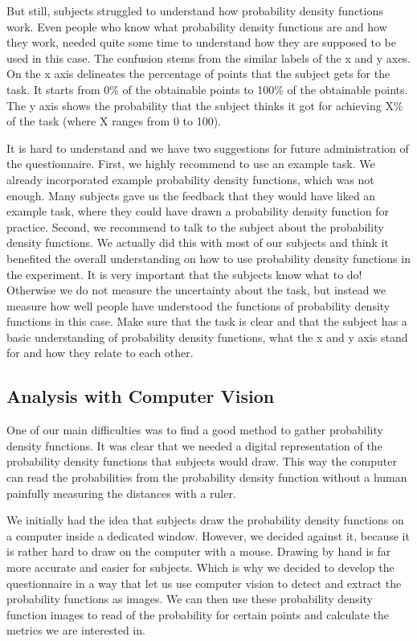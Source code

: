 \documentclass[../main/main.tex]{subfiles}
\begin{document}
	But still, subjects struggled to understand how probability density functions work. Even people who know what probability density functions are and how they work, needed quite some time to understand how they are supposed to be used in this case. The confusion stems from the similar labels of the x and y axes. On the x axis delineates the percentage of points that the subject gets for the task. It starts from 0\% of the obtainable points to 100\% of the obtainable points. The y axis shows the probability that the subject thinks it got for achieving X\% of the task (where X ranges from 0 to 100).
	
	It is hard to understand and we have two suggestions for future administration of the questionnaire. First, we highly recommend to use an example task. We already incorporated example probability density functions, which was not enough. Many subjects gave us the feedback that they would have liked an example task, where they could have drawn a probability density function for practice. Second, we recommend to talk to the subject about the probability density functions. We actually did this with most of our subjects and think it benefited the overall understanding on how to use probability density functions in the experiment. It is very important that the subjects know what to do! Otherwise we do not measure the uncertainty about the task, but instead we measure how well people have understood the functions of probability density functions in this case. Make sure that the task is clear and that the subject has a basic understanding of probability density functions, what the x and y axis stand for and how they relate to each other.
	
	\subsection{Analysis with Computer Vision}
	
	One of our main difficulties was to find a good method to gather probability density functions. It was clear that we needed a digital representation of the probability density functions that subjects would draw. This way the computer can read the probabilities from the probability density function without a human painfully measuring the distances with a ruler.
	
	We initially had the idea that subjects draw the probability density functions on a computer inside a dedicated window. However, we decided against it, because it is rather hard to draw on the computer with a mouse. Drawing by hand is far more accurate and easier for subjects. Which is why we decided to develop the questionnaire in a way that let us use computer vision to detect and extract the probability functions as images. We can then use these probability density function images to read of the probability for certain points and calculate the metrics we are interested in.
	
\end{document}
